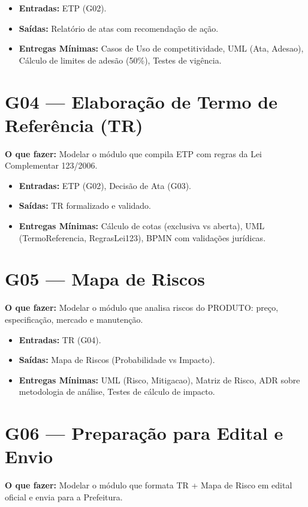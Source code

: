 \documentclass[a4paper,12pt]{article}
\begin{document}
\begin{itemize}[leftmargin=*]
    \item \textbf{Entradas:} ETP (G02).
    \item \textbf{Saídas:} Relatório de atas com recomendação de ação.
    \item \textbf{Entregas Mínimas:} Casos de Uso de competitividade, UML (Ata, Adesao), Cálculo de limites de adesão (50\%), Testes de vigência.
\end{itemize}

\section*{G04 --- Elaboração de Termo de Referência (TR)}
\textbf{O que fazer:} Modelar o módulo que compila ETP com regras da Lei Complementar 123/2006.

\begin{itemize}[leftmargin=*]
    \item \textbf{Entradas:} ETP (G02), Decisão de Ata (G03).
    \item \textbf{Saídas:} TR formalizado e validado.
    \item \textbf{Entregas Mínimas:} Cálculo de cotas (exclusiva vs aberta), UML (TermoReferencia, RegrasLei123), BPMN com validações jurídicas.
\end{itemize}

\section*{G05 --- Mapa de Riscos}
\textbf{O que fazer:} Modelar o módulo que analisa riscos do PRODUTO: preço, especificação, mercado e manutenção.

\begin{itemize}[leftmargin=*]
    \item \textbf{Entradas:} TR (G04).
    \item \textbf{Saídas:} Mapa de Riscos (Probabilidade vs Impacto).
    \item \textbf{Entregas Mínimas:} UML (Risco, Mitigacao), Matriz de Risco, ADR sobre metodologia de análise, Testes de cálculo de impacto.
\end{itemize}

\section*{G06 --- Preparação para Edital e Envio}
\textbf{O que fazer:} Modelar o módulo que formata TR + Mapa de Risco em edital oficial e envia para a Prefeitura.
\end{document}

